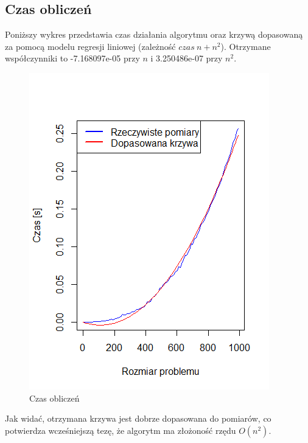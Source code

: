 \documentclass{article}
\begin{document}
\subsection{Czas obliczeń}
Poniższy wykres przedstawia czas działania algorytmu oraz krzywą dopasowaną za pomocą modelu regresji liniowej (zależność $czas ~ n + n^2$). Otrzymane współczynniki to -7.168097e-05 przy $n$ i 3.250486e-07 przy $n^2$.
\begin{figure}[H]
\centering
\includegraphics{czasy.png}
\caption{Czas obliczeń}
\end{figure}
Jak widać, otrzymana krzywa jest dobrze dopasowana do pomiarów, co potwierdza wcześniejszą tezę, że algorytm ma złożoność rzędu $O(n^2)$.
\end{document}
